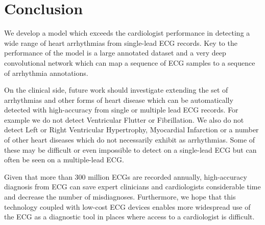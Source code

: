 \section{Conclusion}

We develop a model which exceeds the cardiologist performance in detecting a
wide range of heart arrhythmias from single-lead ECG records. Key to the
performance of the model is a large annotated dataset and a very deep
convolutional network which can map a sequence of ECG samples to a sequence of
arrhythmia annotations. 

On the clinical side, future work should investigate extending the set of
arrhythmias and other forms of heart disease which can be automatically
detected with high-accuracy from single or multiple lead ECG records. For
example we do not detect Ventricular Flutter or Fibrillation. We also do not
detect Left or Right Ventricular Hypertrophy, Myocardial Infarction or a number
of other heart diseases which do not necessarily exhibit as arrhythmias. Some
of these may be difficult or even impossible to detect on a single-lead ECG but
can often be seen on a multiple-lead ECG.

Given that more than 300 million ECGs are recorded annually, high-accuracy
diagnosis from ECG can save expert clinicians and cardiologists considerable
time and decrease the number of misdiagnoses. Furthermore, we hope that this
technology coupled with low-cost ECG devices enables more widespread use of the
ECG as a diagnostic tool in places where access to a cardiologist is difficult.
